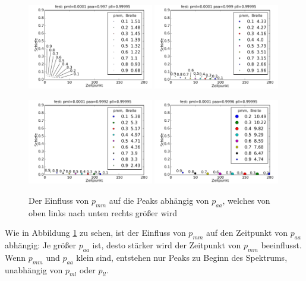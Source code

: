 \begin{figure}[h]
\includegraphics[width=0.49\textwidth]{bilder/pmm/3fest_p_00001_0997_099995}
\includegraphics[width=0.49\textwidth]{bilder/pmm/3fest_p_00001_0999_099995}

\includegraphics[width=0.49\textwidth]{bilder/pmm/3fest_p_00001_09992_099995}
\includegraphics[width=0.49\textwidth]{bilder/pmm/3fest_p_00001_09996_099995}
\caption[Der Einfluss von $p_{mm}$ auf die Peaks abhängig von $p_{aa}$]{Der Einfluss von $p_{mm}$ auf die Peaks abhängig von $p_{aa}$, welches von oben links nach unten rechts größer wird}
\label{einfluss_pmm_1}
\end{figure}

Wie in Abbildung \ref{einfluss_pmm_1} zu sehen, ist der Einfluss von $p_{mm}$ auf den Zeitpunkt von $p_{aa}$ abhängig: Je größer $p_{aa}$ ist, desto stärker wird der Zeitpunkt von $p_{mm}$ beeinflusst. Wenn $p_{mm}$ und $p_{aa}$ klein sind, entstehen nur Peaks zu Beginn des Spektrums, unabhängig von $p_{ml}$ oder $p_{ll}$.

